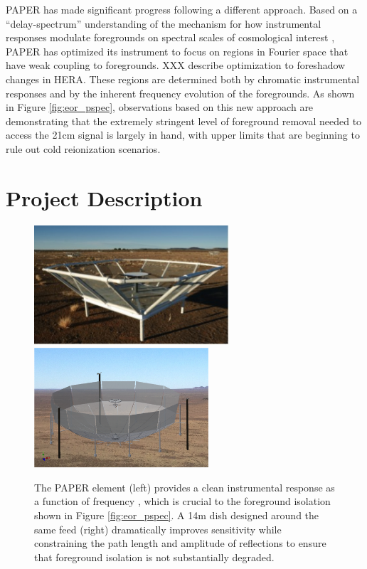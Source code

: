 \documentclass[preprint]{aastex}
\begin{document}
PAPER has made significant progress following a different approach.  Based on a
``delay-spectrum'' understanding of the mechanism for how instrumental
responses modulate foregrounds on spectral scales of cosmological interest
\citep{parsons_et_al2012b}, PAPER has optimized its instrument to focus on
regions in Fourier space that have weak coupling to foregrounds. XXX describe
optimization to foreshadow changes in HERA.  These regions are determined both
by chromatic instrumental responses and by the inherent frequency evolution of
the foregrounds.  As shown in Figure \ref{fig:eor_pspec}, observations based on
this new approach are demonstrating that the extremely stringent level of
foreground removal needed to access the 21cm signal is largely in hand, with
upper limits that are beginning to rule out cold reionization scenarios. 

\vspace{-0.25in}
\section{Project Description}

\begin{figure}[!ht]\centering
\includegraphics[height=1.75in]{plots/paper_element.jpg}
\includegraphics[height=1.75in]{plots/hera_dish.png}
\caption{\small
The PAPER element (left) provides a clean instrumental response as a function
of frequency \citep{parsons_et_al2010,parsons_et_al2012b}, which is crucial to
the foreground isolation shown in Figure \ref{fig:eor_pspec}.  A 14m dish
designed around the same feed (right) dramatically improves sensitivity while
constraining the path length and amplitude of
reflections to ensure that foreground isolation is not substantially degraded.  
}\label{fig:hera_dish}
\end{figure}
\end{document}
